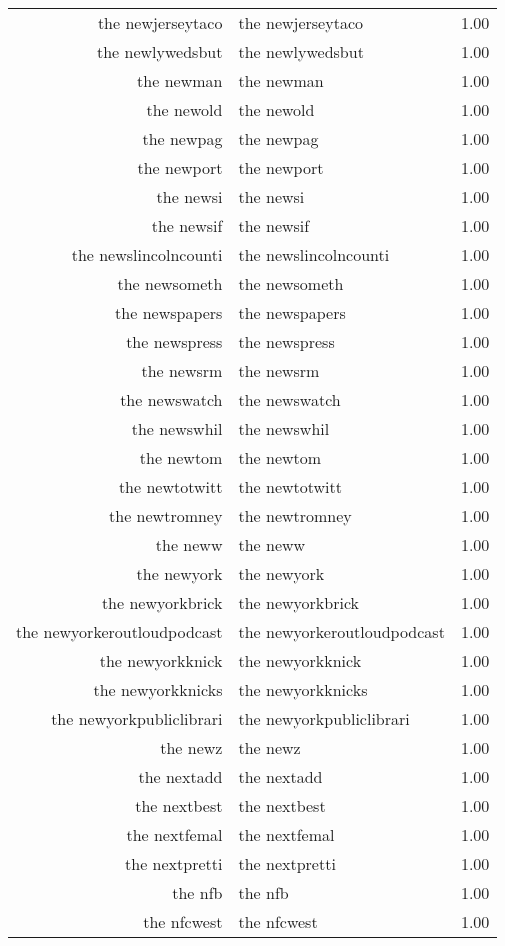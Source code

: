 \begin{table}[ht]
\begin{tabular}{rlr}
  the newjerseytaco & the newjerseytaco & 1.00 \\ 
  the newlywedsbut & the newlywedsbut & 1.00 \\ 
  the newman & the newman & 1.00 \\ 
  the newold & the newold & 1.00 \\ 
  the newpag & the newpag & 1.00 \\ 
  the newport & the newport & 1.00 \\ 
  the newsi & the newsi & 1.00 \\ 
  the newsif & the newsif & 1.00 \\ 
  the newslincolncounti & the newslincolncounti & 1.00 \\ 
  the newsometh & the newsometh & 1.00 \\ 
  the newspapers & the newspapers & 1.00 \\ 
  the newspress & the newspress & 1.00 \\ 
  the newsrm & the newsrm & 1.00 \\ 
  the newswatch & the newswatch & 1.00 \\ 
  the newswhil & the newswhil & 1.00 \\ 
  the newtom & the newtom & 1.00 \\ 
  the newtotwitt & the newtotwitt & 1.00 \\ 
  the newtromney & the newtromney & 1.00 \\ 
  the neww & the neww & 1.00 \\ 
  the newyork & the newyork & 1.00 \\ 
  the newyorkbrick & the newyorkbrick & 1.00 \\ 
  the newyorkeroutloudpodcast & the newyorkeroutloudpodcast & 1.00 \\ 
  the newyorkknick & the newyorkknick & 1.00 \\ 
  the newyorkknicks & the newyorkknicks & 1.00 \\ 
  the newyorkpubliclibrari & the newyorkpubliclibrari & 1.00 \\ 
  the newz & the newz & 1.00 \\ 
  the nextadd & the nextadd & 1.00 \\ 
  the nextbest & the nextbest & 1.00 \\ 
  the nextfemal & the nextfemal & 1.00 \\ 
  the nextpretti & the nextpretti & 1.00 \\ 
  the nfb & the nfb & 1.00 \\ 
  the nfcwest & the nfcwest & 1.00 \\ 

\end{tabular}
\end{table}
